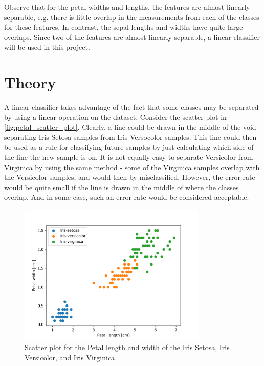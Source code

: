 \documentclass{article}
\begin{document}
Observe that for the petal widths and lengths, the features are almost linearly separable, e.g.
there is little overlap in the measurements from each of the classes for these features. In contrast,
the sepal lengths and widths have quite large overlaps. Since two of the features are almost
linearly separable, a linear classifier will be used in this project.

\section{Theory}\label{sec:theory}

A linear classifier takes advantage of the fact that some classes may be separated by using a
linear operation on the dataset. Consider the scatter plot in \autoref{fig:petal_scatter_plot}.
Clearly, a line could be drawn in the middle of the void separating Iris Setosa samples from
Iris Versocolor samples. This line could then be used as a rule for classifying future samples
by just calculating which side of the line the new sample is on. It is not equally easy to
separate Versicolor from Virginica by using the same method - some of the Virginica samples overlap
with the Versicolor samples, and would then by misclassified. However, the error rate would be
quite small if the line is drawn in the middle of where the classes overlap. And in some case,
such an error rate would be considered acceptable.

\begin{figure}
    \centering
    \includegraphics[width=0.8\textwidth]{../images/petal_scatter.png}
    \caption{Scatter plot for the Petal length and width of the Iris Setosa, Iris Versicolor,
    and Iris Virginica}
    \label{fig:petal_scatter_plot}
\end{figure}
\end{document}
